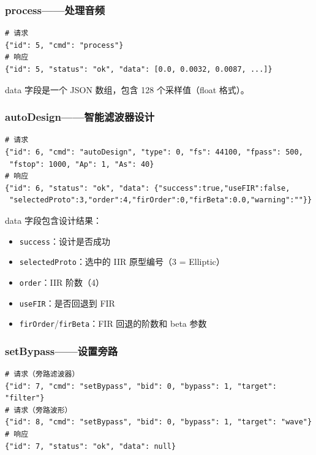 ﻿\documentclass[12pt,a4paper,oneside]{ctexbook}
\begin{document}
\subsubsection{process——处理音频}

\begin{lstlisting}[caption={process 命令格式}]
# 请求
{"id": 5, "cmd": "process"}
# 响应
{"id": 5, "status": "ok", "data": [0.0, 0.0032, 0.0087, ...]}
\end{lstlisting}

data 字段是一个 JSON 数组，包含 128 个采样值（float 格式）。

\subsubsection{autoDesign——智能滤波器设计}

\begin{lstlisting}[caption={autoDesign 命令格式}]
# 请求
{"id": 6, "cmd": "autoDesign", "type": 0, "fs": 44100, "fpass": 500,
 "fstop": 1000, "Ap": 1, "As": 40}
# 响应
{"id": 6, "status": "ok", "data": {"success":true,"useFIR":false,
 "selectedProto":3,"order":4,"firOrder":0,"firBeta":0.0,"warning":""}}
\end{lstlisting}

data 字段包含设计结果：
\begin{itemize}
    \item \texttt{success}：设计是否成功
    \item \texttt{selectedProto}：选中的 IIR 原型编号（3 = Elliptic）
    \item \texttt{order}：IIR 阶数（4）
    \item \texttt{useFIR}：是否回退到 FIR
    \item \texttt{firOrder}/\texttt{firBeta}：FIR 回退的阶数和 beta 参数
\end{itemize}

\subsubsection{setBypass——设置旁路}

\begin{lstlisting}[caption={setBypass 命令格式}]
# 请求（旁路滤波器）
{"id": 7, "cmd": "setBypass", "bid": 0, "bypass": 1, "target": "filter"}
# 请求（旁路波形）
{"id": 8, "cmd": "setBypass", "bid": 0, "bypass": 1, "target": "wave"}
# 响应
{"id": 7, "status": "ok", "data": null}
\end{lstlisting}
\end{document}
